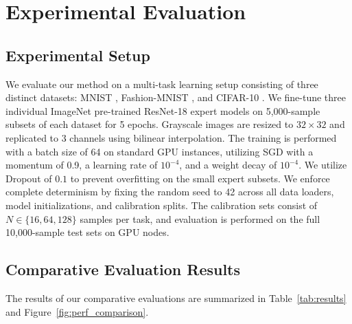 \documentclass{article}
\theoremstyle{plain}
\theoremstyle{definition}
\theoremstyle{remark}
\begin{document}
\section{Experimental Evaluation}
\label{sec:experiments}

\subsection{Experimental Setup}
We evaluate our method on a multi-task learning setup consisting of three distinct datasets: MNIST \cite{mnist}, Fashion-MNIST \cite{fashionmnist}, and CIFAR-10 \cite{cifar10}. We fine-tune three individual ImageNet pre-trained ResNet-18 expert models \cite{he2016resnet, imagenet2012} on 5,000-sample subsets of each dataset for 5 epochs. Grayscale images are resized to $32 \times 32$ and replicated to 3 channels using bilinear interpolation. The training is performed with a batch size of 64 on standard GPU instances, utilizing SGD with a momentum of 0.9, a learning rate of $10^{-4}$, and a weight decay of $10^{-4}$. We utilize Dropout of $0.1$ to prevent overfitting on the small expert subsets. We enforce complete determinism by fixing the random seed to 42 across all data loaders, model initializations, and calibration splits. The calibration sets consist of $N \in \{16, 64, 128\}$ samples per task, and evaluation is performed on the full 10,000-sample test sets on GPU nodes.

\subsection{Comparative Evaluation Results}
The results of our comparative evaluations are summarized in Table~\ref{tab:results} and Figure~\ref{fig:perf_comparison}.
\end{document}
